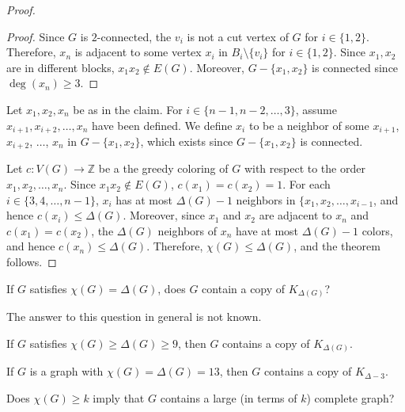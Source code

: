 \begin{proof}
\begin{proof}
        Since \(G\) is \(2\)-connected, the \(v_i\) is not a cut vertex of \(G\) for \(i \in \{1, 2\}\).
        Therefore, \(x_n\) is adjacent to some vertex \(x_i\) in \(B_i \setminus \{v_i\}\) for \(i \in \{1, 2\}\).
        Since \(x_1, x_2\) are in different blocks, \(x_1x_2 \notin E(G)\).
        Moreover, \(G - \{x_1, x_2\}\) is connected since \(\deg(x_n) \geq 3\).
    \end{proof}

    Let \(x_1, x_2, x_n\) be as in the claim.
    For \(i \in \{n-1, n-2, \ldots, 3\}\),
    assume \(x_{i+1}, x_{i+2}, \ldots, x_n\) have been defined.
    We define \(x_i\) to be a neighbor of some \(x_{i+1}\), \(x_{i+2}\), \(\ldots\), \(x_n\) in \(G - \{x_1, x_2\}\), which exists since \(G - \{x_1, x_2\}\) is connected.

    Let \(c \colon V(G) \to \mathbb{Z}\) be a the greedy coloring of \(G\) with respect to the order \(x_1, x_2, \ldots, x_n\).
    Since \(x_1x_2 \notin E(G)\), \(c(x_1) = c(x_2) = 1\).
    For each \(i \in \{3, 4, \ldots, n-1\}\),
    \(x_i\) has at most \(\Delta(G) - 1\) neighbors in \(\{x_1, x_2, \ldots, x_{i-1}\), and hence \(c(x_i) \leq \Delta(G)\).
    Moreover, since \(x_1\) and \(x_2\) are adjacent to \(x_n\) and \(c(x_1) = c(x_2)\), the \(\Delta(G)\) neighbors of \(x_n\) have at most \(\Delta(G) - 1\) colors, and hence \(c(x_n) \leq \Delta(G)\).
    Therefore, \(\chi(G) \leq \Delta(G)\), and the theorem follows.
\end{proof}

\begin{question}
    If \(G\) satisfies \(\chi(G) = \Delta(G)\),
    does \(G\) contain a copy of \(K_{\Delta(G)}\)?
\end{question}

The answer to this question in general is not known.

\begin{conjecture}
    If \(G\) satisfies \(\chi(G) \geq \Delta(G) \geq 9\),
    then \(G\) contains a copy of \(K_{\Delta(G)}\).
\end{conjecture}

\begin{theorem}
    If \(G\) is a graph with \(\chi(G) = \Delta(G) = 13\),
    then \(G\) contains a copy of \(K_{\Delta - 3}\).
\end{theorem}

\begin{question}
    Does \(\chi(G) \geq k\) imply that \(G\) contains a large (in terms of \(k\)) complete graph?
\end{question}


